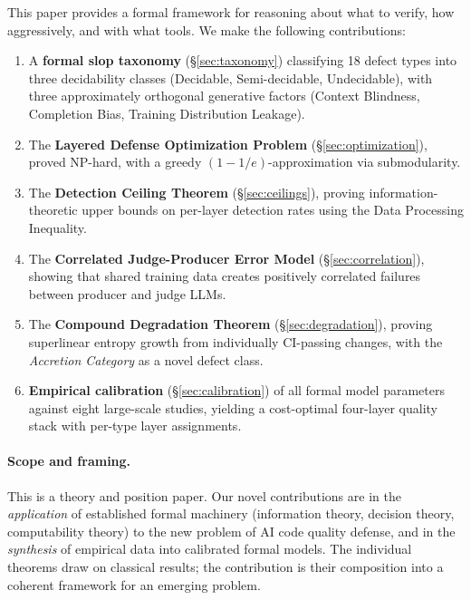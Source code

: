 \documentclass[11pt, a4paper, logo, copyright]{googledeepmind}
\begin{document}
This paper provides a formal framework for reasoning about what to verify, how aggressively, and with what tools. We make the following contributions:

\begin{enumerate}
\item A \textbf{formal slop taxonomy} (\S\ref{sec:taxonomy}) classifying 18 defect types into three decidability classes (Decidable, Semi-decidable, Undecidable), with three approximately orthogonal generative factors (Context Blindness, Completion Bias, Training Distribution Leakage).

\item The \textbf{Layered Defense Optimization Problem} (\S\ref{sec:optimization}), proved NP-hard, with a greedy $(1-1/e)$-approximation via submodularity.

\item The \textbf{Detection Ceiling Theorem} (\S\ref{sec:ceilings}), proving information-theoretic upper bounds on per-layer detection rates using the Data Processing Inequality.

\item The \textbf{Correlated Judge-Producer Error Model} (\S\ref{sec:correlation}), showing that shared training data creates positively correlated failures between producer and judge LLMs.

\item The \textbf{Compound Degradation Theorem} (\S\ref{sec:degradation}), proving superlinear entropy growth from individually CI-passing changes, with the \emph{Accretion Category} as a novel defect class.

\item \textbf{Empirical calibration} (\S\ref{sec:calibration}) of all formal model parameters against eight large-scale studies, yielding a cost-optimal four-layer quality stack with per-type layer assignments.
\end{enumerate}

\paragraph{Scope and framing.} This is a theory and position paper. Our novel contributions are in the \emph{application} of established formal machinery (information theory, decision theory, computability theory) to the new problem of AI code quality defense, and in the \emph{synthesis} of empirical data into calibrated formal models. The individual theorems draw on classical results; the contribution is their composition into a coherent framework for an emerging problem.
\end{document}

